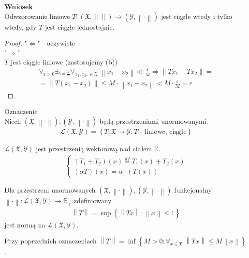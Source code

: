 \textbf{Wniosek}\\
Odwzorowanie liniowe $ T:\left(\mathfrak X,\left\|\right\|\right)\to \left(\mathcal Y,\left\|\cdot \right\|\right) $ jest ciągłe wtedy i tylko wtedy, gdy $ T $ jest ciągłe jednostajnie.
\begin{proof}
"$ \Leftarrow $" - oczywiste\\
"$ \Rightarrow $"\\
$ T $ jest ciągłe liniowe (zastosujemy (b))
\begin{gather*}
\forall_{\varepsilon>0}\exists_{\delta=\frac{\varepsilon}{n}}\forall_{x_1,x_2,\in\mathfrak X}\;\left\|x_1-x_2\right\|<\frac{\varepsilon}{M}\Rightarrow\left\|Tx_1-Tx_2\right\|
=\\=
\left\|T\left(x_1-x_2\right)\right\|\le
M\cdot \left\|x_1-x_2\right\|<M\cdot \frac{\varepsilon}{M}=\varepsilon
\end{gather*}
\end{proof}
Oznaczenie\\
Niech $ \left(\mathfrak X, \left\|\cdot \right\|\right),\left(\mathcal Y,\left\|\cdot \right\|\right) $ będą przestrzeniami unormowanymi.
\begin{gather*}
\mathcal L\left(\mathfrak X,\mathcal Y\right)=\left\{T:\mathfrak X\to \mathcal Y:T\text{ - liniowe, ciągłe}\right\}
\end{gather*}
\begin{twr}
$ \mathcal L\left(\mathfrak X,\mathcal Y\right) $ jest przestrzenią wektorową nad ciałem $ \mathbb K $.
\begin{gather*}
\left \{
\begin{array}{l}
\left(T_1+T_2\right)(x)\stackrel{df}{=}T_1(x)+T_2(x)\\
\left(\alpha T\right)(x)=\alpha\cdot \left(T(x)\right)
\end{array}
\right .
\end{gather*}
\end{twr}
\begin{twr}
Dla przestrzeni unormowanych $ \left(\mathfrak X, \left\|\cdot \right\|\right),\left(\mathcal Y,\left\|\cdot \right\|\right) $ funkcjonalny $ \left\|\cdot\right\|:\mathcal L\left(\mathfrak X,\mathcal Y\right)\to \mathbb R _+ $ zdefiniowany
\begin{gather*}
\left\|T\right\|=\sup\left\{\left\|Tx\right\|:\left\|x\right\|\le 1\right\}
\end{gather*}
jest normą na $ \mathcal L\left(\mathfrak X, \mathcal Y\right) $.
\end{twr}
\begin{twr}
Przy poprzednich oznaczeniach $ \left\|T\right\| =\inf\left\{M>0:\forall_{x\in\mathfrak X}\;\left\|Tx\right\|\le M\left\|x\right\|\right\}$.
\end{twr}
